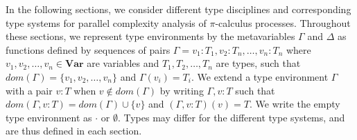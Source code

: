 In the following sections, we consider different type disciplines and corresponding type systems for parallel complexity analysis of $\pi$-calculus processes. Throughout these sections, we represent type environments by the metavariables $\Gamma$ and $\Delta$ as functions defined by sequences of pairs $\Gamma = v_1 : T_1,v_2 : T_n,\dots,v_n : T_n$ where $v_1,v_2,\dots,v_n \in \mathbf{Var}$ are variables and $T_1,T_2,\dots,T_n$ are types, such that $\textit{dom}(\Gamma) = \{v_1,v_2,\dots,v_n\}$ and $\Gamma(v_i) = T_i$. We extend a type environment $\Gamma$ with a pair $v : T$ when $v \notin \textit{dom}(\Gamma)$ by writing $\Gamma, v : T$ such that $\textit{dom}(\Gamma, v : T) = \textit{dom}(\Gamma) \cup \{v\}$ and $(\Gamma, v : T)(v) = T$. We write the empty type environment as $\cdot$ or $\emptyset$. Types may differ for the different type systems, and are thus defined in each section.





%
%